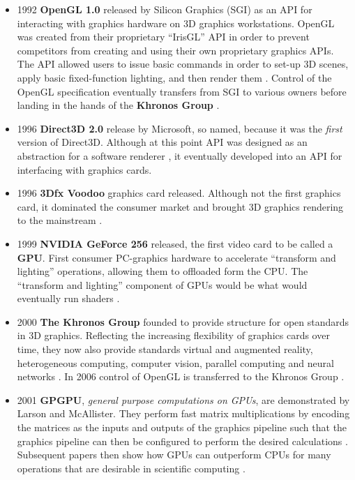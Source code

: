 \documentclass[a4paper,12pt,twoside,openright]{report}
\begin{document}
\begin{itemize}

    \item 1992 \textbf{OpenGL 1.0} released by Silicon Graphics (SGI) as an API
    for interacting with graphics hardware on 3D graphics workstations. OpenGL
    was created from their proprietary ``IrisGL'' API in order to prevent
    competitors from creating and using their own proprietary graphics APIs.
    The API allowed users to issue basic commands in order to set-up 3D scenes,
    apply basic fixed-function lighting, and then render them
    \cite{OpenGL_1_0}. Control of the OpenGL specification eventually transfers
    from SGI to various owners before landing in the hands of the
    \textbf{Khronos Group} \cite{OpenCL}.

    \item 1996 \textbf{Direct3D 2.0} release by Microsoft, so named, because it
    was the \textit{first} version of Direct3D. Although at this point API was
    designed as an abstraction for a software renderer
    \cite{JohnCarmackPlanDirect3DvsOpenGl}, it eventually developed into an API
    for interfacing with graphics cards.

    \item 1996 \textbf{3Dfx Voodoo} graphics card released. Although not the
    first graphics card, it dominated the consumer market and brought 3D
    graphics rendering to the mainstream \cite{TODO}.

    \item 1999 \textbf{NVIDIA GeForce 256} released, the first video card to be
    called a \textbf{GPU}. First consumer PC-graphics hardware to accelerate
    ``transform and lighting'' operations, allowing them to offloaded form the
    CPU. The ``transform and lighting'' component of GPUs would be what would
    eventually run shaders \cite{GeForce256}.

    \item 2000 \textbf{The Khronos Group} founded to provide structure for open
    standards in 3D graphics. Reflecting the increasing flexibility of graphics
    cards over time, they now also provide standards virtual and augmented
    reality, heterogeneous computing, computer vision, parallel computing and
    neural networks \cite{KhronosGroupAbout}. In 2006 control of OpenGL is
    transferred to the Khronos Group \cite{OpenGLToKhronos}.

    \item 2001 \textbf{GPGPU}, \textit{general purpose computations on GPUs},
    are demonstrated by Larson and McAllister. They perform fast matrix
    multiplications by encoding the matrices as the inputs and outputs of the
    graphics pipeline such that the graphics pipeline can then be configured to
    perform the desired calculations \cite{MatrixGPU}. Subsequent papers then
    show how GPUs can outperform CPUs for many operations that are desirable in
    scientific computing \cite{CUDAtoOpenCL} \cite{Kruger03linearalgebra}
    \cite{LUGPU} \cite{SparsematrixGPU}.


\end{itemize}
\end{document}
